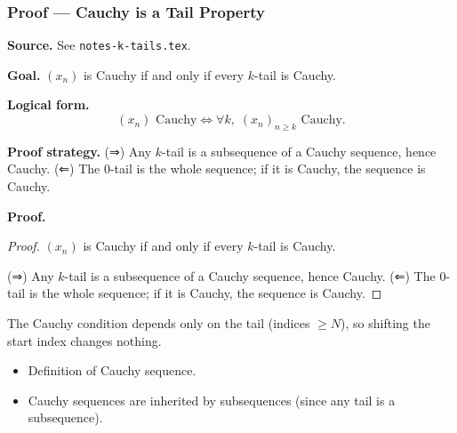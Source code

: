 
\clearpage
{}
\hypertarget{proof-RA-ABB-T-cauchy-tail-prop}{}

\subsubsection[Cauchy is a Tail Property]{Proof --- Cauchy is a Tail Property}

\bigskip

\noindent
\textbf{Source.}
See \texttt{notes-k-tails.tex}.

\vspace{0.75em}

\noindent
\textbf{Goal.}
$(x_n)$ is Cauchy if and only if every $k$-tail is Cauchy.

\vspace{0.75em}

\noindent
\textbf{Logical form.}
\[
  (x_n) \text{ Cauchy} \Longleftrightarrow \forall k,\; (x_n)_{n \ge k} \text{ Cauchy}.
\]

\vspace{0.75em}

\noindent
\textbf{Proof strategy.}
(⇒) Any $k$-tail is a subsequence of a Cauchy sequence, hence Cauchy. (⇐) The $0$-tail is the whole sequence; if it is Cauchy, the sequence is Cauchy.

\vspace{0.75em}

\noindent
\textbf{Proof.}
\begin{proof}
\Claim $(x_n)$ is Cauchy if and only if every $k$-tail is Cauchy.

\Given 

\Goal 

\Strategy (⇒) Any $k$-tail is a subsequence of a Cauchy sequence, hence Cauchy. (⇐) The $0$-tail is the whole sequence; if it is Cauchy, the sequence is Cauchy.

\medskip


\end{proof}

\begin{remark*}
The Cauchy condition depends only on the tail (indices $\ge N$), so shifting the start index changes nothing.
\end{remark*}

\begin{remark*}[Dependencies]
\begin{itemize}
  \item Definition of Cauchy sequence.
  \item Cauchy sequences are inherited by subsequences (since any tail is a subsequence).
\end{itemize}
\end{remark*}
